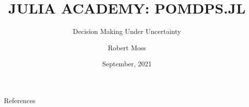 \documentclass[aspectratio=169]{beamer}
\title{\Large{J}\normalsize{ULIA} \Large{A}\normalsize{CADEMY}: \Large{POMDP}\normalsize{S.JL}} %
\subtitle{Decision Making Under Uncertainty\blfootnote{Slides created with \url{https://github.com/mossr/julia-tufte-beamer}}}
\author{Robert Moss}
\institute{CS PhD Student, Stanford University}
\date{September, 2021}
\begin{document}
\begin{frame}
    \maketitle
\end{frame}


% 
% 
% 
% 
% 
% 
% 
% 
% 
% 
% 
% 
% 
% 




\begin{frame}{References}
    \renewcommand*{\bibfont}{\scriptsize}
    \printbibliography
\end{frame}
\end{document}
